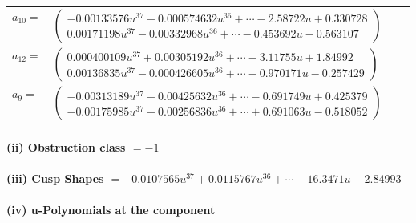 \documentclass[1p]{elsarticle_modified}
\theoremstyle{definition}
\begin{document}
\begin{tabular}{m{7pt} m{180pt} m{7pt} m{180pt} }
\flushright $a_{10}=$&$\begin{pmatrix}-0.00133576 u^{37}+0.000574632 u^{36}+\cdots-2.58722 u+0.330728\\0.00171198 u^{37}-0.00332968 u^{36}+\cdots-0.453692 u-0.563107\end{pmatrix}$ \\
\flushright $a_{12}=$&$\begin{pmatrix}0.000400109 u^{37}+0.00305192 u^{36}+\cdots-3.11755 u+1.84992\\0.00136835 u^{37}-0.000426605 u^{36}+\cdots-0.970171 u-0.257429\end{pmatrix}$ \\
\flushright $a_{9}=$&$\begin{pmatrix}-0.00313189 u^{37}+0.00425632 u^{36}+\cdots-0.691749 u+0.425379\\-0.00175985 u^{37}+0.00256836 u^{36}+\cdots+0.691063 u-0.518052\end{pmatrix}$\\&\end{tabular}
\flushleft \textbf{(ii) Obstruction class $= -1$}\\~\\
\flushleft \textbf{(iii) Cusp Shapes $= -0.0107565 u^{37}+0.0115767 u^{36}+\cdots-16.3471 u-2.84993$}\\~\\
\newpage\renewcommand{\arraystretch}{1}
\flushleft \textbf{(iv) u-Polynomials at the component}\newline \\
\end{document}
